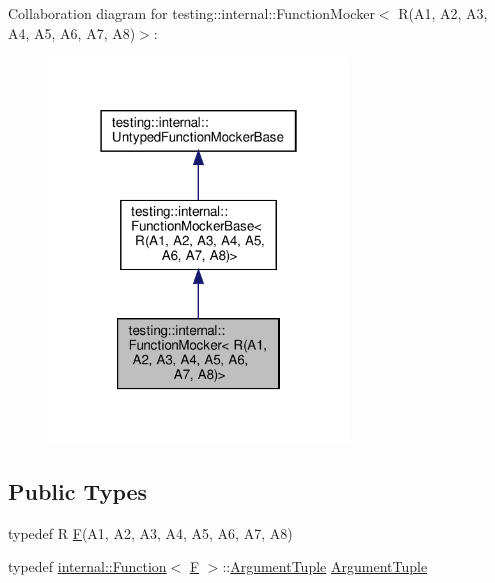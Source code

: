 Collaboration diagram for testing\+:\+:internal\+:\+:Function\+Mocker$<$ R(A1, A2, A3, A4, A5, A6, A7, A8)$>$\+:
\nopagebreak
\begin{figure}[H]
\begin{center}
\leavevmode
\includegraphics[width=226pt]{classtesting_1_1internal_1_1_function_mocker_3_01_r_07_a1_00_01_a2_00_01_a3_00_01_a4_00_01_a5_0050347b4d73117fb12b6b1f47f62cd269}
\end{center}
\end{figure}
\subsection*{Public Types}
\begin{DoxyCompactItemize}
\item 
typedef R \hyperlink{classtesting_1_1internal_1_1_function_mocker_3_01_r_07_a1_00_01_a2_00_01_a3_00_01_a4_00_01_a5_00_01_a6_00_01_a7_00_01_a8_08_4_ad9749c93b0a17540778c5fa162a5fe6c}{F}(A1, A2, A3, A4, A5, A6, A7, A8)
\item 
typedef \hyperlink{structtesting_1_1internal_1_1_function}{internal\+::\+Function}$<$ \hyperlink{classtesting_1_1internal_1_1_function_mocker_3_01_r_07_a1_00_01_a2_00_01_a3_00_01_a4_00_01_a5_00_01_a6_00_01_a7_00_01_a8_08_4_ad9749c93b0a17540778c5fa162a5fe6c}{F} $>$\+::\hyperlink{classtesting_1_1internal_1_1_function_mocker_3_01_r_07_a1_00_01_a2_00_01_a3_00_01_a4_00_01_a5_00_01_a6_00_01_a7_00_01_a8_08_4_a57bc2be00815deac8964e2d2ae62fdd2}{Argument\+Tuple} \hyperlink{classtesting_1_1internal_1_1_function_mocker_3_01_r_07_a1_00_01_a2_00_01_a3_00_01_a4_00_01_a5_00_01_a6_00_01_a7_00_01_a8_08_4_a57bc2be00815deac8964e2d2ae62fdd2}{Argument\+Tuple}
\end{DoxyCompactItemize}
